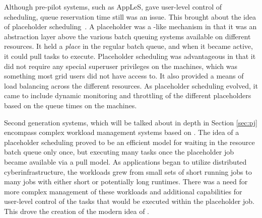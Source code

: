 \documentclass{sig-alternate}
\begin{document}
Although pre-pilot systems, such as AppLeS, gave user-level control of scheduling, queue reservation time still was an issue. This brought about the idea of placeholder scheduling~\cite{Pinchak02practicalheterogeneous, Singh:2008:WTC:1341811.1341822}. A placeholder was a \pilot-like mechanism in that it was an abstraction layer above the various batch queuing systems available on different resources. It held a \textit{place} in the regular batch queue, and when it became active, it could pull tasks to execute. Placeholder scheduling was advantageous in that it did not require any special superuser privileges on the machines, which was something most grid users did not have access to. It also provided a means of load balancing across the different resources. As placeholder scheduling evolved, it came to include dynamic monitoring and throttling of the different placeholders based on the queue times on the machines.

Second generation systems, which will be talked about in depth in Section \ref{sec:pj} encompass complex workload management systems based on \pilots. The idea of a placeholder scheduling proved to be an efficient model for waiting in the resource batch queue only once, but executing many tasks once the placeholder job became available via a pull model. As applications began to utilize distributed cyberinfrastructure, the workloads grew from small sets of short running jobs to many jobs with either short or potentially long runtimes. There was a need for more complex management of these workloads and additional capabilities for user-level control of the tasks that would be executed within the placeholder job. This drove the creation of the modern idea of \pilots. 
 


\end{document}
